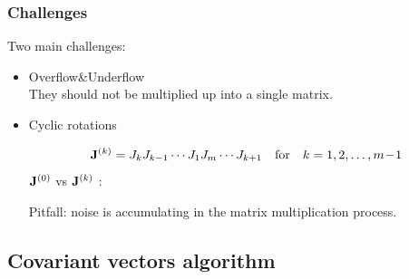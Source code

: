 \documentclass[mathserif, handout]{beamer}
\begin{document}
\begin{frame}
  \frametitle{Challenges}
  Two main challenges:
  \begin{itemize}
  \item
    {\color{green} Overflow\quad\&\quad Underflow} \\

    They should not be multiplied up into a single matrix.

    \vspace{1em}
    \pause

  \item
    {\color{green} Cyclic rotations}

    \[
    \mathbf{J}^{(k)}=J_{k}J_{k-1}\cdots J_{1}J_{m}\cdots
    J_{k+1} \quad \text{for}\quad k=1,2,\dots,m\!-\!1
    \]
    $\mathbf{J}^{(0)}$ vs $\mathbf{J}^{(k)}$ :

    \vspace{1em}
    \pause

    {\color{red} Pitfall}:
    noise is accumulating in the matrix multiplication process.

  \end{itemize}


\end{frame}

\subsection{Covariant vectors algorithm}
\end{document}
